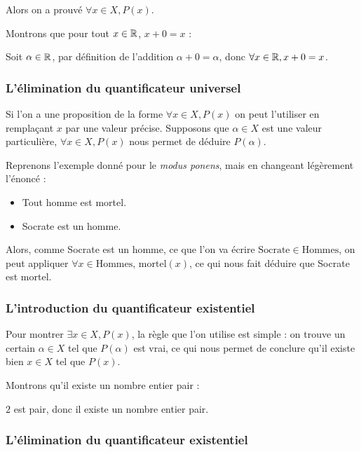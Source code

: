 Alors on a prouvé $\forall x\in X, P(x)$.

\begin{expl}
    Montrons que pour tout $x\in \mathbb{R}$, $x+0=x$ :
    
    Soit $\alpha \in \mathbb{R}$, par définition de l'addition $\alpha+0=\alpha$, donc $\forall x\in \mathbb{R}, x+0=x$.
\end{expl}

\subsubsection{L'élimination du quantificateur universel}

Si l'on a une proposition de la forme $\forall x\in X, P(x)$ on peut l'utiliser en remplaçant $x$ par une valeur précise. Supposons que $\alpha \in X$ est une valeur particulière, $\forall x \in X, P(x)$ nous permet de déduire $P(\alpha)$.

\begin{expl}
    Reprenons l'exemple donné pour le \textit{modus ponens}, mais en changeant légèrement l'énoncé :
    \begin{itemize}[label=$\bullet$]
        \item Tout homme est mortel.
        \item Socrate est un homme.
    \end{itemize}
    
    Alors, comme Socrate est un homme, ce que l'on va écrire $\mathrm{Socrate}\in\mathrm{Hommes}$, on peut appliquer $\forall x\in\mathrm{Hommes}, \,\mathrm{mortel}(x)$, ce qui nous fait déduire que Socrate est mortel.
\end{expl}

\subsubsection{L'introduction du quantificateur existentiel}

Pour montrer $\exists x\in X, P(x)$, la règle que l'on utilise est simple : on trouve un certain $\alpha \in X$ tel que $P(\alpha)$ est vrai, ce qui nous permet de conclure qu'il existe bien $x\in X$ tel que $P(x)$.

\begin{expl}
    Montrons qu'il existe un nombre entier pair :
    
    $2$ est pair, donc il existe un nombre entier pair.
\end{expl}

\subsubsection{L'élimination du quantificateur existentiel}

